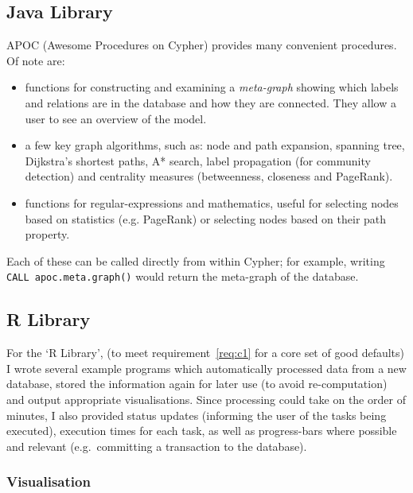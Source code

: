 \subsection{Java Library}

APOC (Awesome Procedures on Cypher) provides many convenient procedures. Of
note are:

\begin{itemize}

  \item functions for constructing and examining a \emph{meta-graph} showing
    which labels and relations are in the database and how they are connected.
    They allow a user to see an overview of the model.

  \item a few key graph algorithms, such as: node and path expansion, spanning
    tree, Dijkstra's shortest paths, A* search, label propagation (for community
    detection) and centrality measures (betweenness, closeness and PageRank).

  \item functions for regular-expressions and mathematics, useful for selecting
    nodes based on statistics (e.g. PageRank) or selecting nodes based on their
    path property.

\end{itemize}

Each of these can be called directly from within Cypher; for example, writing
\texttt{CALL apoc.meta.graph()} would return the meta-graph of the database.

\subsection{R Library}

For the `R Library', (to meet requirement~\ref{req:c1} for a core set of good
defaults) I wrote several example programs which automatically processed data
from a new database, stored the information again for later use (to avoid
re-computation) and output appropriate visualisations.  Since processing could
take on the order of minutes, I also provided status updates (informing the user
of the tasks being executed), execution times for each task, as well as
progress-bars where possible and relevant (e.g.\ committing a transaction to the
database).

\subsubsection{Visualisation}

